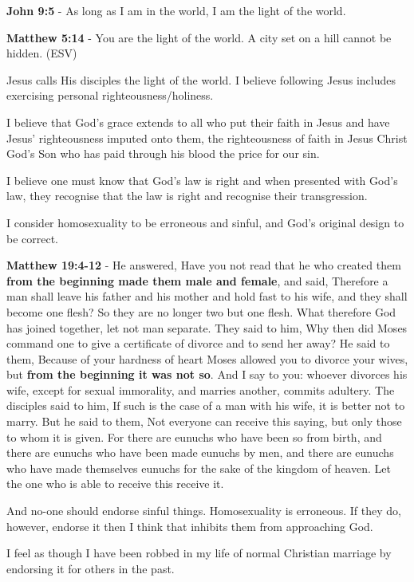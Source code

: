 \documentclass[11pt]{article}
\begin{document}
\textbf{John 9:5} - As long as I am in the world, I am the light of the world.

\textbf{Matthew 5:14} - You are the light of the world. A city set on a hill cannot be hidden. (ESV)

Jesus calls His disciples the light of the world.
I believe following Jesus includes exercising personal righteousness/holiness.

I believe that God's grace extends to all who
put their faith in Jesus and have Jesus'
righteousness imputed onto them, the
righteousness of faith in Jesus Christ God's
Son who has paid through his blood the price
for our sin.

I believe one must know that God's law is
right and when presented with God's law, they
recognise that the law is right and recognise
their transgression.

I consider homosexuality to be erroneous and sinful, and God's original design to be correct.

\textbf{Matthew 19:4-12} - He answered, Have you not read that he who created them \textbf{from the beginning made them male and female}, and said, Therefore a man shall leave his father and his mother and hold fast to his wife, and they shall become one flesh?  So they are no longer two but one flesh. What therefore God has joined together, let not man separate.  They said to him, Why then did Moses command one to give a certificate of divorce and to send her away?  He said to them, Because of your hardness of heart Moses allowed you to divorce your wives, but \textbf{from the beginning it was not so}.  And I say to you: whoever divorces his wife, except for sexual immorality, and marries another, commits adultery.  The disciples said to him, If such is the case of a man with his wife, it is better not to marry.  But he said to them, Not everyone can receive this saying, but only those to whom it is given.  For there are eunuchs who have been so from birth, and there are eunuchs who have been made eunuchs by men, and there are eunuchs who have made themselves eunuchs for the sake of the kingdom of heaven. Let the one who is able to receive this receive it.

And no-one should endorse sinful things. Homosexuality is erroneous.
If they do, however, endorse it then I think that inhibits them from approaching God.

I feel as though I have been robbed in my life of normal Christian marriage by endorsing it for others in the past.
\end{document}
